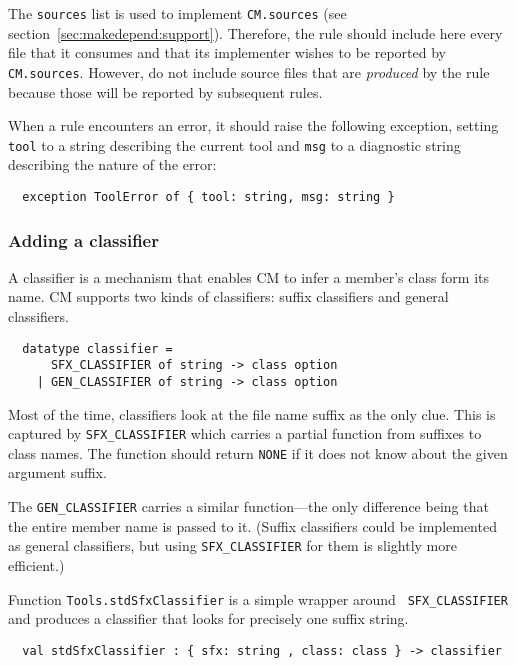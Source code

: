 The {\tt sources} list is used to implement {\tt CM.sources} (see
section~\ref{sec:makedepend:support}).  Therefore, the rule should
include here every file that it consumes and that its implementer
wishes to be reported by {\tt CM.sources}. However, do not include
source files that are {\em produced} by the rule because those will be
reported by subsequent rules.

When a rule encounters an error, it should raise the following
exception, setting {\tt tool} to a string describing the current tool
and {\tt msg} to a diagnostic string describing the nature of the
error:

\begin{verbatim}
  exception ToolError of { tool: string, msg: string }
\end{verbatim}

\subsubsection{Adding a classifier}

A classifier is a mechanism that enables CM to infer a member's class
form its name.  CM supports two kinds of classifiers: suffix
classifiers and general classifiers.

\begin{verbatim}
  datatype classifier =
      SFX_CLASSIFIER of string -> class option
    | GEN_CLASSIFIER of string -> class option
\end{verbatim}

Most of the time, classifiers look at the file name suffix as the only
clue.  This is captured by {\tt SFX\_CLASSIFIER} which carries a
partial function from suffixes to class names.  The function should
return {\tt NONE} if it does not know about the given argument suffix.

The {\tt GEN\_CLASSIFIER} carries a similar function---the only
difference being that the entire member name is passed to it.  (Suffix
classifiers could be implemented as general classifiers, but using
{\tt SFX\_CLASSIFIER} for them is slightly more efficient.)

Function {\tt Tools.stdSfxClassifier} is a simple wrapper around {\tt
SFX\_CLASSIFIER} and produces a classifier that looks for precisely
one suffix string.

\begin{verbatim}
  val stdSfxClassifier : { sfx: string , class: class } -> classifier
\end{verbatim}

